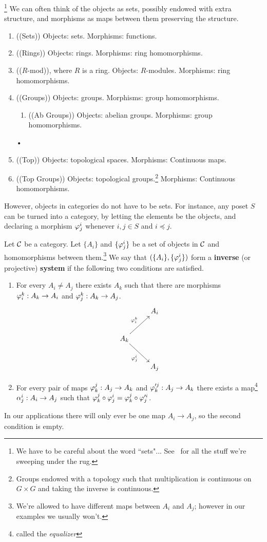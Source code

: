 \begin{ex}\footnote{We have to be careful about the word ``sets"... See~\cite{Ma71} for all the stuff we're sweeping under the rug.}
We can often think of the objects as sets, possibly endowed with extra structure, and morphisms as maps between them preserving the structure.
\begin{enumerate}
\item ((Sets)) Objects: sets. Morphisms: functions.
\item ((Rings)) Objects: rings. Morphisms: ring homomorphisms.
\item (($R$-mod)), where $R$ is a ring. Objects: $R$-modules. Morphisms: ring homomorphisms.
\item ((Groups)) Objects: groups. Morphisms: group homomorphisms. %
\begin{enumerate}
\item
((Ab Groups)) Objects: abelian groups. Morphisms: group homomorphisms.
\end{enumerate}•
\item ((Top)) Objects: topological spaces. Morphisms: Continuous maps.
\item ((Top Groups)) Objects: topological groups.\footnote{Groups endowed with a topology such that multiplication is continuous on $G\times G$ and taking the inverse is continuous.}
Morphisms: Continuous homomorphisms.
\end{enumerate}
However, objects in categories do not have to be sets. For instance, any poset $S$ can be turned into a category, by letting the elements be the objects, and declaring a morphism $\ph^i_j$ whenever $i,j\in S$ and $i\preccurlyeq j$.
\end{ex}
\begin{df}
Let $\cal C$ be a category. 
Let $\{A_i\}$ and $\{\ph^i_j\}$ be a set of objects in $\cal C$ and homomorphisms between them.\footnote{We're allowed to have different maps between $A_i$ and $A_j$; however in our examples we usually won't.} 
We say that $(\{A_i\}, \{\ph^i_j\})$ form a \textbf{inverse} (or projective) \textbf{system} if the following two conditions are satisfied.
\begin{enumerate}
\item For every $A_i\ne A_j$ there exists $A_k$ such that there are morphisms $\ph^k_i:A_k\to A_i$ and $\ph^k_j:A_k\to A_j$.
\[
\xymatrix{
& A_i\\
A_k\ar[ru]^{\ph^k_i}\ar[rd]_{\ph^i_j} &\\
&A_j
}
\]
\item For every pair of maps $\ph^j_k:A_j\to A_k$ and $\ph'^j_k:A_j\to A_k$ there exists a map\footnote{called the {\it equalizer}} $\al^i_j:A_i\to A_j$ such that $\ph^j_k\circ \ph^i_j=\ph^j_k\circ \ph'^i_j$.
\end{enumerate}
\end{df}
In our applications there will only ever be one map $A_i\to A_j$, so the second condition is empty.

